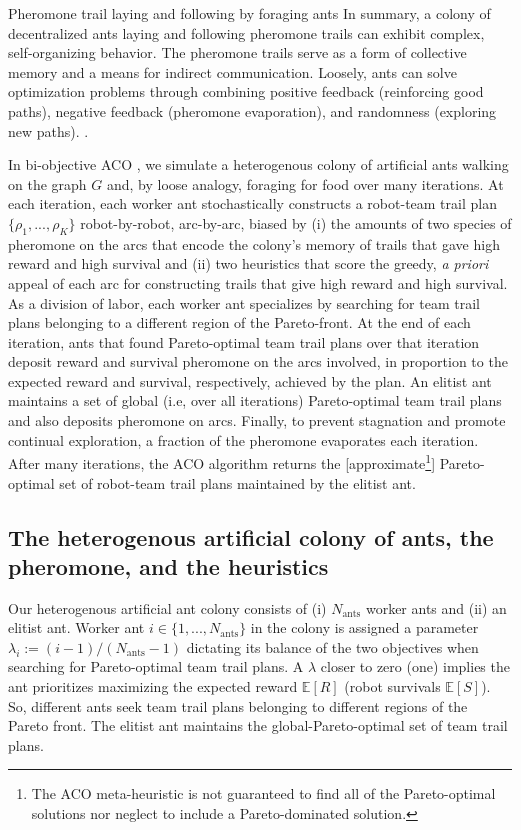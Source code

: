 \documentclass[fleqn,10pt,lineno]{wlpeerj}
\begin{document}
\begin{mybox}[label=box:ants, breakable]{Pheromone trail laying and following by foraging ants}
In summary, a colony of decentralized ants laying and following pheromone trails can exhibit complex, self-organizing behavior.
The pheromone trails serve as a form of collective memory and a means for indirect communication.
Loosely, ants can solve optimization problems through combining positive feedback (reinforcing good paths), negative feedback (pheromone evaporation), and randomness (exploring new paths). \cite{bonabeau1997self,bonabeau1999swarm,goss1989self,jackson2006communication,edelstein1995trail,watmough1995modelling}.
\end{mybox}

In bi-objective ACO \cite{iredi2001bi}, we simulate a heterogenous colony of artificial ants walking on the graph $G$ and, by loose analogy, foraging for food over many iterations. 
At each iteration, each worker ant stochastically constructs a robot-team trail plan $\{\rho_1, ..., \rho_K\}$ robot-by-robot, arc-by-arc, biased by 
(i) the amounts of two species of pheromone on the arcs that encode the colony's memory of trails that gave high reward and high survival
and 
(ii) two heuristics that score the greedy, \emph{a priori} appeal of each arc for constructing trails that give high reward and high survival.  
As a division of labor, each worker ant specializes by searching for team trail plans belonging to a different region of the Pareto-front.
At the end of each iteration, ants that found Pareto-optimal team trail plans over that iteration deposit reward and survival pheromone on the arcs involved, in proportion to the expected reward and survival, respectively, achieved by the plan.
An elitist ant \cite{dorigo1996ant} maintains a set of global (i.e, over all iterations) Pareto-optimal team trail plans and also deposits pheromone on arcs.
Finally, to prevent stagnation and promote continual exploration, a fraction of the pheromone evaporates each iteration. After many iterations, the ACO algorithm returns the [approximate\footnote{The ACO meta-heuristic is not guaranteed to find all of the Pareto-optimal solutions nor neglect to include a Pareto-dominated solution.}] Pareto-optimal set of robot-team trail plans maintained by the elitist ant. 


\subsection{The heterogenous artificial colony of ants, the pheromone, and the heuristics}
Our heterogenous artificial ant colony consists of (i) $N_{\text{ants}}$ worker ants and (ii) an elitist ant.
Worker ant $i\in\{1, ..., N_{\text{ants}}\}$ in the colony is assigned a parameter $\lambda_i := (i-1) / (N_{\text{ants}}-1)$ dictating its balance of the two objectives when searching for Pareto-optimal team trail plans.
A $\lambda$ closer to zero (one) implies the ant prioritizes maximizing the expected reward $\mathbb{E}[R]$ (robot survivals $\mathbb{E}[S]$). 
So, different ants seek team trail plans belonging to different regions of the Pareto front.
The elitist ant maintains the global-Pareto-optimal set of team trail plans.
\end{document}
